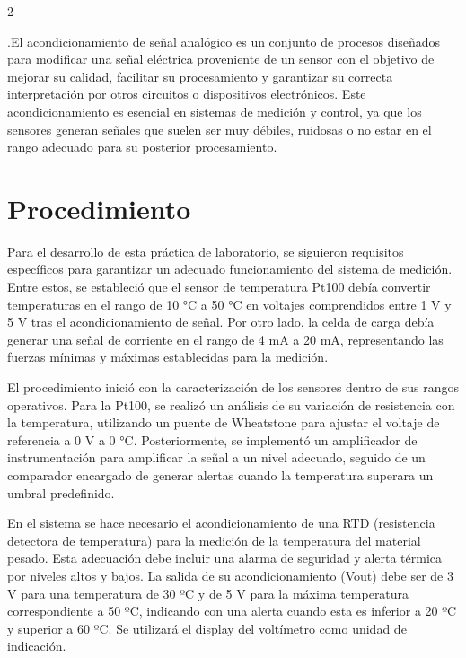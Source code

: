 \documentclass{article}
\begin{document}
\begin{multicols}{2}
\vspace{0.2cm}

.El acondicionamiento de señal analógico es un conjunto de procesos diseñados para modificar una señal eléctrica proveniente de un sensor con el objetivo de mejorar su calidad, facilitar su procesamiento y garantizar su correcta interpretación por otros circuitos o dispositivos electrónicos. Este acondicionamiento es esencial en sistemas de medición y control, ya que los sensores generan señales que suelen ser muy débiles, ruidosas o no estar en el rango adecuado para su posterior procesamiento.

\vspace{0.2cm}

\section{Procedimiento}

Para el desarrollo de esta práctica de laboratorio, se siguieron requisitos específicos para garantizar un adecuado funcionamiento del sistema de medición. Entre estos, se estableció que el sensor de temperatura Pt100 debía convertir temperaturas en el rango de 10 °C a 50 °C en voltajes comprendidos entre 1 V y 5 V tras el acondicionamiento de señal. Por otro lado, la celda de carga debía generar una señal de corriente en el rango de 4 mA a 20 mA, representando las fuerzas mínimas y máximas establecidas para la medición.

\vspace{0.2cm}

El procedimiento inició con la caracterización de los sensores dentro de sus rangos operativos. Para la Pt100, se realizó un análisis de su variación de resistencia con la temperatura, utilizando un puente de Wheatstone para ajustar el voltaje de referencia a 0 V a 0 °C. Posteriormente, se implementó un amplificador de instrumentación para amplificar la señal a un nivel adecuado, seguido de un comparador encargado de generar alertas cuando la temperatura superara un umbral predefinido.

\vspace{0.2cm}

En el sistema se hace necesario el acondicionamiento de una RTD (resistencia detectora de temperatura) para la medición de la temperatura del material pesado. Esta adecuación debe incluir una alarma de seguridad y alerta térmica por niveles altos y bajos. La salida de su acondicionamiento (Vout) debe ser de 3 V para una temperatura de 30 ºC y de 5 V para la máxima temperatura correspondiente a 50 ºC, indicando con una alerta cuando esta es inferior a 20 ºC y superior a 60 ºC. Se utilizará el display del voltímetro como unidad de indicación.


\end{multicols}
\end{document}
